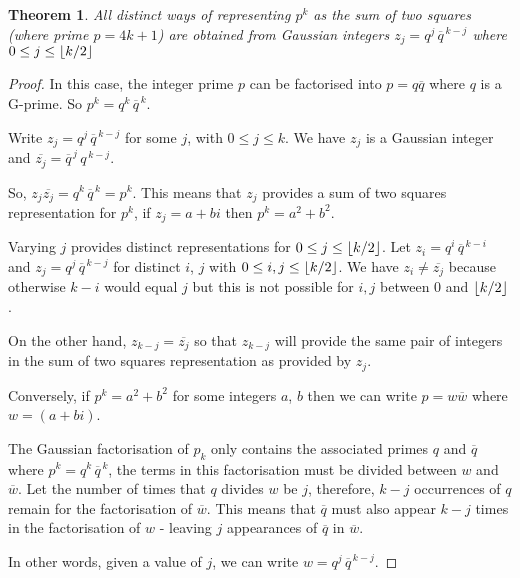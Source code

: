 \documentclass[11pt]{amsart}
\newtheorem{theorem}{Theorem}[section]
\begin{document}
\begin{theorem}
All distinct ways of representing $p^{k}$ as the sum of two squares (where prime $p=4k+1$) are obtained from Gaussian integers $z_{j} = q^{j} \, \overline{q}^{\,k - j}$ where  $0 \le j \le  \left\lfloor {k/2} \right\rfloor $
\end{theorem}

\begin{proof}


In this case, the integer prime $p$ can be factorised into $p = q \overline{q}$ where $q$ is a G-prime. So $p^{k}= q^{k} \, \overline{q}^{\,k}$.

Write $z_{j} =  q^{j} \, \overline{q}^{\,k - j}$ for some $j$, with $0 \le j \le k$.
We have $z_{j}$ is a Gaussian integer and $\overline{z_{j}} = \overline{q}^{\, j} \, q^{\,k - j}$. 

So, $z_{j} \overline{z_{j}} = q^{k} \, \overline{q}^{\,k} = p^{k}$. This means that $z_{j}$ provides a sum of two squares representation for $p^{k}$, if $z_{j} = a + b i$ then $p^{k} = a^{2} + b^{2}$.

Varying $j$ provides distinct representations for $0 \le j \le  \left\lfloor {k/2} \right\rfloor $. 
Let $z_{i} = q^{i} \, \overline{q}^{\,k - i}$ and $z_{j} = q^{j} \, \overline{q}^{\,k - j}$ for distinct $i$, $j$ with $0 \le i,j \le  \left\lfloor {k/2} \right\rfloor $. We have $z_{i} \ne \overline{z_{j}}$ because otherwise $k-i$ would equal $j$ but this is not possible for $i,j$ between 0 and $ \left\lfloor {k/2} \right\rfloor $.

On the other hand, $z_{k-j} =  \overline{z_{j}}$ so that $z_{k-j}$ will provide the same pair of integers in the sum of two squares representation as provided by $z_{j}$.

\vspace{1em}

Conversely, if $p^{k} = a^{2} + b^{2}$ for some integers $a$, $b$ then we can write $p = w \overline{w}$ where $w =  (a + b i) $.

The Gaussian factorisation of $p_{k}$ only contains the associated primes $q$ and $\overline{q}$ where $p^{k}= q^{k} \, \overline{q}^{\,k}$, the terms in this factorisation must be divided between $w$ and $\overline{w}$. Let the number of times that $q$ divides $w$ be $j$, therefore, $k-j$ occurrences of $q$ remain for the factorisation of $\overline{w}$.
This means that $\overline{q}$ must also appear $k-j$ times in the factorisation of $w$ - leaving $j$ appearances of $\overline{q}$ in $\overline{w}$.

In other words, given a value of $j$, we can write  $w = q^{j} \, \overline{q}^{\,k - j}$.

\end{proof}
\end{document}
